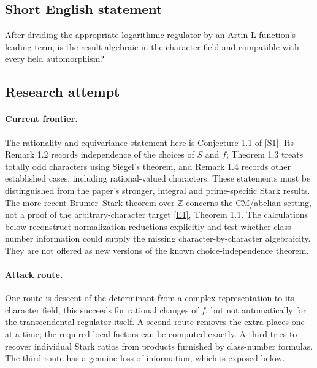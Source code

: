 \documentclass[11pt,a4paper]{article}
\newcommand{\Z}{\mathbb{Z}}
\newcommand{\sref}[2]{\hyperlink{source:#1:#2}{[S#2]}}
\newcommand{\eref}[2]{\hyperlink{extra:#1:#2}{[E#2]}}
\numberwithin{equation}{section}
\begin{document}
\subsection{Short English statement}
After dividing the appropriate logarithmic regulator by an Artin L-function's leading term, is the result algebraic in the character field and compatible with every field automorphism?
\subsection{Research attempt}

\paragraph{Current frontier.}
The rationality and equivariance statement here is Conjecture 1.1 of
\sref{166}{1}. Its Remark 1.2 records independence of the choices of $S$
and $f$; Theorem 1.3 treats totally odd characters using Siegel's theorem,
and Remark 1.4 records other established cases, including rational-valued
characters. These statements must be distinguished from the paper's
stronger, integral and prime-specific Stark results. The more recent
Brumer--Stark theorem over $\Z$ concerns the CM/abelian setting, not a
proof of the arbitrary-character target \eref{166}{1}, Theorem 1.1.
The calculations below reconstruct normalization reductions explicitly
and test whether class-number information could supply the missing
character-by-character algebraicity. They are not offered as new
versions of the known choice-independence theorem.

\paragraph{Attack route.}
One route is descent of the determinant from a complex representation
to its character field; this succeeds for rational changes of $f$, but
not automatically for the transcendental regulator itself. A second
route removes the extra places one at a time; the required local
factors can be computed exactly. A third tries to recover individual
Stark ratios from products furnished by class-number formulas. The
third route has a genuine loss of information, which is exposed below.
\end{document}
